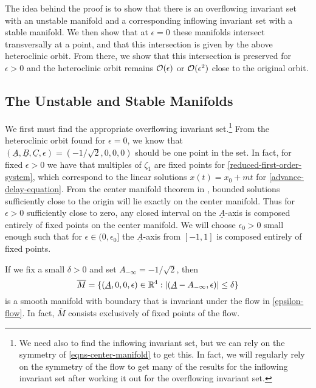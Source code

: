 The idea behind the proof is to show that there is an overflowing invariant set with an unstable manifold and a corresponding inflowing invariant set with a stable manifold. We then show that at \(\epsilon = 0\) these manifolds intersect transversally at a point, and that this intersection is given by the above heteroclinic orbit. From there, we show that this intersection is preserved for \(\epsilon > 0\) and the heteroclinic orbit remains \(\mathcal{O}(\epsilon)\) or \(\mathcal{O}(\epsilon^2)\) close to the original orbit.

\subsection{The Unstable and Stable Manifolds}\label{sec:manifolds}

We first must find the appropriate overflowing invariant set.\footnote{We need also to find the inflowing invariant set, but we can rely on the symmetry of \cref{eqns-center-manifold} to get this. In fact, we will regularly rely on the symmetry of the flow to get many of the results for the inflowing invariant set after working it out for the overflowing invariant set.} From the heteroclinic orbit found for \(\epsilon = 0\), we know that \((\underline A,\underline B,\underline C, \epsilon) = (-1/\sqrt 2 , 0 ,0, 0)\) should be one point in the set. In fact, for fixed \(\epsilon> 0\) we have that multiples of \(\zeta_1\) are fixed points for \cref{reduced-first-order-system}, which correspond to the linear solutions \(x(t) = x_0 + mt\) for \cref{advance-delay-equation}. From the center manifold theorem in \cite{vanderbauwhede1992center}, bounded solutions sufficiently close to the origin will lie exactly on the center manifold. Thus for \(\epsilon>0\) sufficiently close to zero, any closed interval on the \(\underline A\)-axis is composed entirely of fixed points on the center manifold. We will choose \(\epsilon_0> 0\) small enough such that for \(\epsilon \in (0,\epsilon_0]\) the \(\underline A\)-axis from \([-1,1]\) is composed entirely of fixed points. 



If we fix a small \(\delta > 0\) and set \(A_{-\infty} = - 1/ \sqrt 2\), then 
\begin{equation}
	\overline M = \{(\underline A, 0, 0, \epsilon) \in \mathbb{R}^4: |(\underline A - A_{-\infty},  \epsilon)| \leq \delta\}
\end{equation}
is a smooth manifold with boundary that is invariant under the flow in \cref{epsilon-flow}. In fact, \(\overline M\) consists exclusively of fixed points of the flow.

